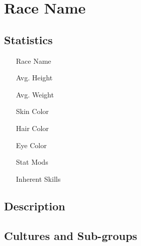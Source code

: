 \chapter{Race Name}

\section{Statistics}

\begin{itemize}
	\item[Race Name]
	\item[Avg. Height]
	\item[Avg. Weight]
	\item[Skin Color]
	\item[Hair Color]
	\item[Eye Color]
	\item[Stat Mods]
	\item[Inherent Skills]
\end{itemize}

\section{Description}

\section{Cultures and Sub-groups}

